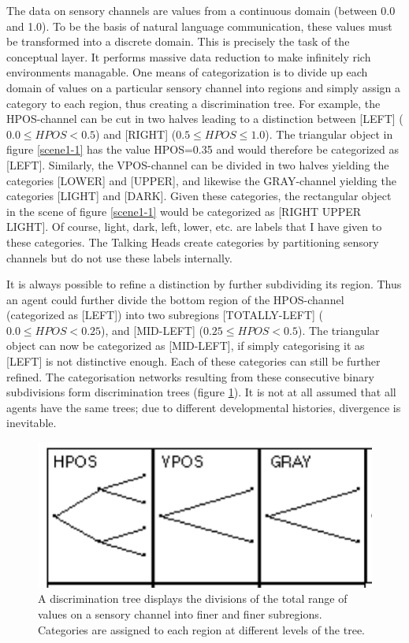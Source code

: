 The data on sensory channels are values from a continuous domain
(between 0.0 and 1.0). 
To be the basis of natural language communication, these
values must be transformed into a discrete domain. This is 
precisely the task of the conceptual layer. It 
performs massive data reduction to make infinitely
rich environments managable. One means of categorization
is to divide up each domain of values on a particular
sensory channel into regions and 
simply assign a category to each region, thus creating a 
discrimination tree. For example, 
the HPOS-channel can be cut in two halves leading to a 
distinction between [LEFT] ($0.0 \leq HPOS < 0.5$) and [RIGHT] 
($0.5 \leq HPOS \leq 1.0$). The triangular object 
in figure \ref{scene1-1} has the value HPOS=0.35 
and would therefore be categorized as [LEFT]. Similarly, the 
VPOS-channel can be divided in two halves yielding the 
categories [LOWER] and [UPPER], and likewise the GRAY-channel
yielding the categories [LIGHT] and [DARK]. 
Given these categories, 
the rectangular object in the scene of 
figure \ref{scene1-1} would be categorized as [RIGHT UPPER LIGHT].
Of course, light, dark, left, lower, etc. are labels 
that I have given to these categories. The Talking Heads 
create categories by partitioning sensory channels but do
not use these labels internally. 

It is always possible to refine a distinction by further
subdividing its region. Thus an agent could further divide the 
bottom region of the HPOS-channel (categorized as 
[LEFT]) into two subregions [TOTALLY-LEFT] ($0.0 \le HPOS < 0.25$), 
and [MID-LEFT] ($0.25 \le HPOS < 0.5$). The triangular object
can now be categorized as [MID-LEFT], if simply categorising it
as [LEFT] is not distinctive enough. Each of these categories can 
still be further refined. The categorisation networks
resulting from these consecutive binary subdivisions form
discrimination trees (figure \ref{tree1}). It is not at
all assumed that all agents have the same trees; due to 
different developmental histories, divergence is inevitable. 
\begin{figure}[htbp]
  \centerline{\includegraphics[width=.35\textwidth]{chap2/figs/tree1}}
\caption{\small\label{tree1} A discrimination tree displays
the divisions of the total range of 
values on a sensory channel into finer and finer subregions. 
Categories are assigned to each region at different 
levels of the tree.}
\end{figure}

